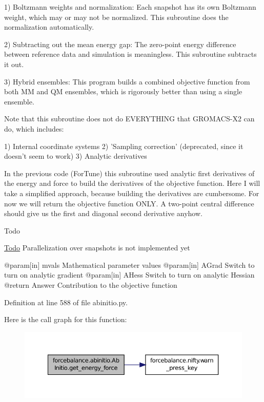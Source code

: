 1) Boltzmann weights and normalization\-: Each snapshot has its own Boltzmann weight, which may or may not be normalized. This subroutine does the normalization automatically.

2) Subtracting out the mean energy gap\-: The zero-\/point energy difference between reference data and simulation is meaningless. This subroutine subtracts it out.

3) Hybrid ensembles\-: This program builds a combined objective function from both M\-M and Q\-M ensembles, which is rigorously better than using a single ensemble.

Note that this subroutine does not do E\-V\-E\-R\-Y\-T\-H\-I\-N\-G that G\-R\-O\-M\-A\-C\-S-\/\-X2 can do, which includes\-:

1) Internal coordinate systems 2) 'Sampling correction' (deprecated, since it doesn't seem to work) 3) Analytic derivatives

In the previous code (For\-Tune) this subroutine used analytic first derivatives of the energy and force to build the derivatives of the objective function. Here I will take a simplified approach, because building the derivatives are cumbersome. For now we will return the objective function O\-N\-L\-Y. A two-\/point central difference should give us the first and diagonal second derivative anyhow.

\begin{DoxyRefDesc}{Todo}
\item[\hyperlink{todo__todo000005}{Todo}]Parallelization over snapshots is not implemented yet\end{DoxyRefDesc}
\begin{DoxyVerb}     @param[in] mvals Mathematical parameter values
     @param[in] AGrad Switch to turn on analytic gradient
     @param[in] AHess Switch to turn on analytic Hessian
     @return Answer Contribution to the objective function\end{DoxyVerb}
 

Definition at line 588 of file abinitio.\-py.



Here is the call graph for this function\-:
\nopagebreak
\begin{figure}[H]
\begin{center}
\leavevmode
\includegraphics[width=350pt]{classforcebalance_1_1abinitio_1_1AbInitio_ace85b4ad9266a96d16e39a4c6b440b7f_cgraph}
\end{center}
\end{figure}


